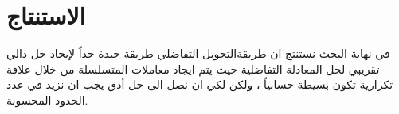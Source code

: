 \chapter*{الاستنتاج}
في نهاية البحث نستنتج ان طريقةالتحويل التفاضلي طريقة جيدة جداً لإيجاد حل دالي تقريبي لحل المعادلة التفاضلية حيث يتم ايجاد معاملات المتسلسلة من خلال علاقة تكرارية تكون بسيطة حسابياً ، ولكن لكي ان نصل الى حل أدق يجب ان نزيد في عدد الحدود المحسوبة.